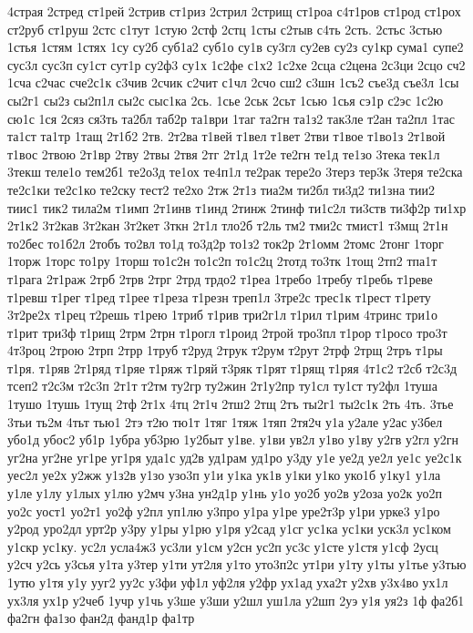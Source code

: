 4страя
2стред
ст1рей
2стрив
ст1риз
2стрил
2стрищ
ст1роа
с4т1ров
ст1род
ст1рох
ст2руб
ст1руш
2стс
с1тут
1стую
2стф
2стц
1сты
с2тыв
с4ть
2сть.
2стьс
3стью
1стья
1стям
1стях
1су
су2б
суб1а2
суб1о
су1в
су3гл
су2ев
су2з
су1кр
сума1
супе2
сус3л
сус3п
су1ст
сут1р
су2ф3
су1х
1с2фе
с1х2
1с2хе
2сца
с2цена
2с3ци
2сцо
сч2
1сча
с2час
сче2с1к
с3чив
2счик
с2чит
с1чл
2счо
сш2
с3шн
1съ2
съе3д
съе3л
1сы
сы2г1
сы2з
сы2п1л
сы2с
сыс1ка
2сь.
1сье
2ськ
2сьт
1сью
1сья
сэ1р
с2эс
1с2ю
сю1с
1ся
2сяз
ся3ть
та2бл
таб2р
та1ври
1таг
та2гн
та1з2
так3ле
т2ан
та2пл
1тас
та1ст
та1тр
1тащ
2т1б2
2тв.
2т2ва
т1вей
т1вел
т1вет
2тви
т1вое
т1во1з
2т1вой
т1вос
2твою
2т1вр
2тву
2твы
2твя
2тг
2т1д
1т2е
те2гн
те1д
те1зо
3тека
тек1л
3текш
теле1о
тем2б1
те2о3д
те1ох
те4п1л
те2рак
тере2о
3терз
тер3к
3теря
те2ска
те2с1ки
те2с1ко
те2ску
тест2
те2хо
2тж
2т1з
тиа2м
ти2бл
ти3д2
ти1зна
тии2
тиис1
тик2
тила2м
т1имп
2т1инв
т1инд
2тинж
2тинф
ти1с2л
ти3ств
ти3ф2р
ти1хр
2т1к2
3т2кав
3т2кан
3т2кет
3ткн
2т1л
тло2б
т2ль
тм2
тми2с
тмист1
т3мщ
2т1н
то2бес
то1б2л
2тобъ
то2вл
то1д
то3д2р
то1з2
ток2р
2т1омм
2томс
2тонг
1торг
1торж
1торс
то1ру
1торш
то1с2н
то1с2п
то1с2ц
2тотд
то3тк
1тощ
2тп2
тпа1т
т1рага
2т1раж
2трб
2трв
2трг
2трд
трдо2
т1реа
1требо
1требу
т1ребь
т1реве
т1ревш
т1рег
т1ред
т1рее
т1реза
т1резн
треп1л
3тре2с
трес1к
т1рест
т1рету
3т2ре2х
т1рец
т2решь
т1рею
1триб
т1рив
три2г1л
т1рил
т1рим
4тринс
три1о
т1рит
три3ф
т1рищ
2трм
2трн
т1рогл
т1роид
2трой
тро3пл
т1рор
т1росо
тро3т
4т3роц
2трою
2трп
2трр
1труб
т2руд
2трук
т2рум
т2рут
2трф
2трщ
2тръ
т1ры
т1ря.
т1ряв
2т1ряд
т1ряе
т1ряж
т1ряй
т3ряк
т1рят
т1рящ
т1ряя
4т1с2
т2сб
т2с3д
тсеп2
т2с3м
т2с3п
2т1т
т2тм
ту2гр
ту2жин
2т1у2пр
ту1сл
ту1ст
ту2фл
1туша
1тушо
1тушь
1тущ
2тф
2т1х
4тц
2т1ч
2тш2
2тщ
2тъ
ты2г1
ты2с1к
2ть
4ть.
3тье
3тьи
ть2м
4тьт
тью1
2тэ
т2ю
тю1т
1тяг
1тяж
1тяп
2тя2ч
у1а
у2але
у2ас
у3бел
убо1д
убос2
уб1р
1убра
уб3рю
1у2быт
у1ве.
у1ви
ув2л
у1во
у1ву
у2гв
у2гл
у2гн
уг2на
уг2не
уг1ре
уг1ря
уда1с
уд2в
уд1рам
уд1ро
у3ду
у1е
уе2д
уе2л
уе1с
уе2с1к
уес2л
уе2х
у2жж
у1з2в
у1зо
узо3п
у1и
у1ка
ук1в
у1ки
у1ко
уко1б
у1ку1
у1ла
у1ле
у1лу
у1лых
у1лю
у2мч
у3на
ун2д1р
у1нь
у1о
уо2б
уо2в
у2оза
уо2к
уо2п
уо2с
уост1
уо2т1
уо2ф
у2пл
уп1лю
у3про
у1ра
у1ре
уре2т3р
у1ри
урке3
у1ро
у2род
уро2дл
урт2р
у3ру
у1ры
у1рю
у1ря
у2сад
у1сг
ус1ка
ус1ки
уск3л
ус1ком
у1скр
ус1ку.
ус2л
усла4ж3
ус3ли
у1см
у2сн
ус2п
ус3с
у1сте
у1стя
у1сф
2усц
у2сч
у2сь
у3сья
у1та
у3тер
у1ти
ут2ля
у1то
уто3п2с
ут1ри
у1ту
у1ты
у1тье
у3тью
1утю
у1тя
у1у
ууг2
уу2с
у3фи
уф1л
уф2ля
у2фр
ух1ад
уха2т
у2хв
у3х4во
ух1л
ух3ля
ух1р
у2чеб
1учр
у1чь
у3ше
у3ши
у2шл
уш1ла
у2шп
2уэ
у1я
уя2з
1ф
фа2б1
фа2гн
фа1зо
фан2д
фанд1р
фа1тр
